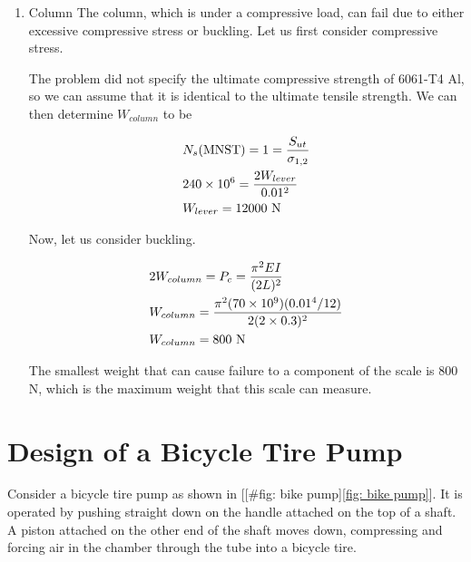 \documentclass[a4paper,openany,12pt]{book}
\begin{document}
{{\begin{enumerate}
\begin{enumerate}
\item Column
\label{column}
The column, which is under a compressive load, can fail due to either
excessive compressive stress or buckling. Let us first consider
compressive stress.

The problem did not specify the ultimate compressive strength of 6061-T4
Al, so we can assume that it is identical to the ultimate tensile
strength. We can then determine \(W_{column}\) to be

$$\begin{gathered}
  N_s\text{(MNST)} = 1 = \frac{S_{ut}}{\sigma_{1,2}} \hfill \\
  240 \times 10^6 = \frac{2W_{lever}}{0.01^2} \hfill \\
  W_{lever} = 12000\text{ N} \hfill \\ 
\end{gathered}$$

Now, let us consider buckling.

$$\begin{gathered}
  2W_{column} = P_c = \frac{\pi ^2EI}{(2L)^2} \hfill \\
  W_{column} = \frac{\pi ^2(70 \times 10^9)(0.01^4/12)}{2(2 \times 0.3)^2} \hfill \\
  W_{column} = 800\text{ N} \hfill \\ 
\end{gathered}$$

The smallest weight that can cause failure to a component of the scale
is 800 N, which is the maximum weight that this scale can measure.
\end{enumerate}
\end{enumerate}

\section{Design of a Bicycle Tire Pump}
\label{design-of-a-bicycle-tire-pump}
    Consider a bicycle tire pump as shown in
[[\#fig: bike pump]\ref{fig: bike pump}]. It is operated by pushing
straight down on the handle attached on the top of a shaft. A piston
attached on the other end of the shaft moves down, compressing and
forcing air in the chamber through the tube into a bicycle tire.

}}
\end{document}
